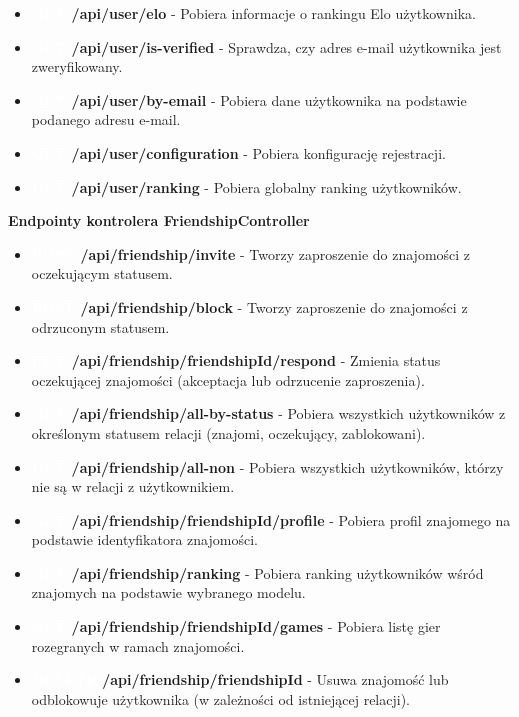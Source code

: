 \documentclass[twoside]{projektInzynierskiMS1}
\begin{document}
\begin{itemize}
    \item \textbf{\colorbox{cyan!90}{\textcolor{white}{GET}} /api/user/elo} - Pobiera informacje o rankingu Elo użytkownika. 
    \item \textbf{\colorbox{cyan!90}{\textcolor{white}{GET}} /api/user/is-verified} - Sprawdza, czy adres e-mail użytkownika jest zweryfikowany. 
    \item \textbf{\colorbox{cyan!90}{\textcolor{white}{GET}} /api/user/by-email} - Pobiera dane użytkownika na podstawie podanego adresu e-mail. 
    \item \textbf{\colorbox{cyan!90}{\textcolor{white}{GET}} /api/user/configuration} - Pobiera konfigurację rejestracji. 
    \item \textbf{\colorbox{cyan!90}{\textcolor{white}{GET}} /api/user/ranking} - Pobiera globalny ranking użytkowników. 
\end{itemize}

\newpage

\noindent  \textbf{Endpointy kontrolera FriendshipController}
\begin{itemize} 
    \setlength\itemsep{0cm}
    \item \textbf{\colorbox{green!90}{\textcolor{white}{POST}} /api/friendship/invite} - Tworzy zaproszenie do znajomości z oczekującym statusem. 
    \item \textbf{\colorbox{green!90}{\textcolor{white}{POST}} /api/friendship/block} - Tworzy zaproszenie do znajomości z odrzuconym statusem. 
    \item \textbf{\colorbox{orange!90}{\textcolor{white}{PUT}} /api/friendship/{friendshipId}/respond} - Zmienia status oczekującej znajomości (akceptacja lub odrzucenie zaproszenia). 
    \item \textbf{\colorbox{cyan!90}{\textcolor{white}{GET}} /api/friendship/all-by-status} - Pobiera wszystkich użytkowników z określonym statusem relacji (znajomi, oczekujący, zablokowani). 
    \item \textbf{\colorbox{cyan!90}{\textcolor{white}{GET}} /api/friendship/all-non} - Pobiera wszystkich użytkowników, którzy nie są w relacji z użytkownikiem. 
    \item \textbf{\colorbox{cyan!90}{\textcolor{white}{GET}} /api/friendship/{friendshipId}/profile} - Pobiera profil znajomego na podstawie identyfikatora znajomości. 
    \item \textbf{\colorbox{cyan!90}{\textcolor{white}{GET}} /api/friendship/ranking} - Pobiera ranking użytkowników wśród znajomych na podstawie wybranego modelu. 
    \item \textbf{\colorbox{cyan!90}{\textcolor{white}{GET}} /api/friendship/{friendshipId}/games} - Pobiera listę gier rozegranych w ramach znajomości. 
    \item \textbf{\colorbox{red!90}{\textcolor{white}{DELETE}} /api/friendship/{friendshipId}} - Usuwa znajomość lub odblokowuje użytkownika (w zależności od istniejącej relacji). 
\end{itemize}
\end{document}
